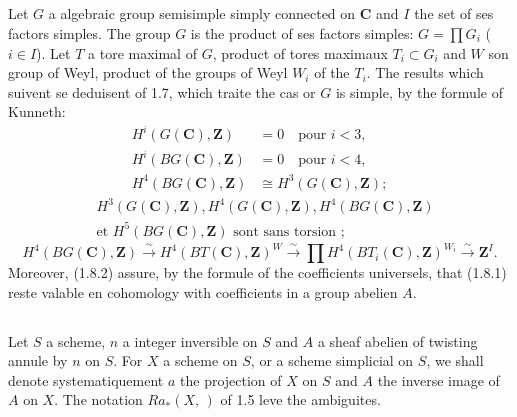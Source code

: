 \documentclass[11pt,a4paper]{article}
\theoremstyle{plain}
\theoremstyle{definition}
\begin{document}
\subsection{}\label{1.8}

Let $G$ a algebraic group semisimple simply connected on $\mathbf{C}$ and $I$ the set of ses factors simples. The group $G$ is the product of ses factors simples: $G = \prod G_i$ ($i \in I$). Let $T$ a tore maximal of $G$, product of tores maximaux $T_i \subset G_i$ and $W$ son group of Weyl, product of the groups of Weyl $W_i$ of the $T_i$. The results which suivent se deduisent of 1.7, which traite the cas or $G$ is simple, by the formule of Kunneth:
\begin{equation}\label{1.8.1}
\begin{aligned}
H^i(G(\mathbf{C}), \mathbf{Z}) &= 0 \quad \text{pour } i < 3, \\
H^i(BG(\mathbf{C}), \mathbf{Z}) &= 0 \quad \text{pour } i < 4, \\
H^4(BG(\mathbf{C}), \mathbf{Z}) &\cong H^3(G(\mathbf{C}), \mathbf{Z});
\end{aligned}
\end{equation}
\begin{equation}\label{1.8.2}
\begin{aligned}
&H^3(G(\mathbf{C}), \mathbf{Z}), H^4(G(\mathbf{C}), \mathbf{Z}), H^4(BG(\mathbf{C}), \mathbf{Z}) \\
&\text{et } H^5(BG(\mathbf{C}), \mathbf{Z}) \text{ sont sans torsion ;}
\end{aligned}
\end{equation}
\begin{equation}\label{1.8.3}
H^4(BG(\mathbf{C}), \mathbf{Z}) \xrightarrow{\sim} H^4(BT(\mathbf{C}), \mathbf{Z})^W \xrightarrow{\sim} \prod H^4(BT_i(\mathbf{C}), \mathbf{Z})^{W_i} \xrightarrow{\sim} \mathbf{Z}^I.
\end{equation}
Moreover, (1.8.2) assure, by the formule of the coefficients universels, that (1.8.1) reste valable en cohomology with coefficients in a group abelien $A$.

\subsection{}\label{1.9}

Let $S$ a scheme, $n$ a integer inversible on $S$ and $A$ a sheaf abelien of twisting annule by $n$ on $S$. For $X$ a scheme on $S$, or a scheme simplicial on $S$, we shall denote systematiquement $a$ the projection of $X$ on $S$ and $A$ the inverse image of $A$ on $X$. The notation $R a_*(X, \,)$ of 1.5 leve the ambiguites.
\end{document}
